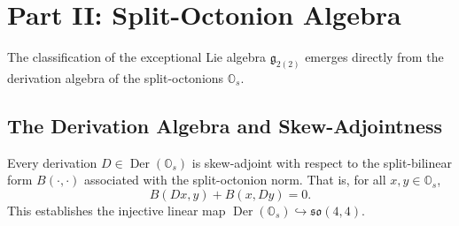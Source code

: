 \section{Part II: Split-Octonion Algebra}
\label{sec:part2}

The classification of the exceptional Lie algebra $\mathfrak{g}_{2(2)}$ emerges directly from the derivation algebra of the split-octonions $\mathbb{O}_s$.

\subsection{The Derivation Algebra and Skew-Adjointness}

\begin{ktheorem}
Every derivation $D \in \operatorname{Der}(\mathbb{O}_s)$ is skew-adjoint with respect to the split-bilinear form $B(\cdot, \cdot)$ associated with the split-octonion norm. That is, for all $x, y \in \mathbb{O}_s$,
\begin{equation}
B(D x, y) + B(x, D y) = 0.
\end{equation}
This establishes the injective linear map $\operatorname{Der}(\mathbb{O}_s) \hookrightarrow \mathfrak{so}(4,4)$.
\end{ktheorem}

\begin{mtheorem}
\end{mtheorem}
